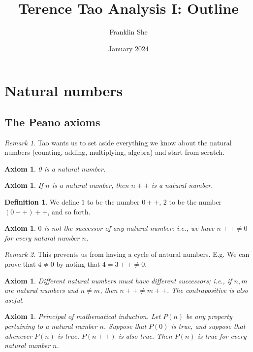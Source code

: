\documentclass[12pt]{article}
\title{Terence Tao Analysis I: Outline}
\author{Franklin She}
\date{January 2024}
\newtheorem{axiom}[theorem]{Axiom}
\theoremstyle{definition}
\newtheorem{definition}[theorem]{Definition}
\theoremstyle{remark}
\newtheorem*{remark}{Remark}
\begin{document}
\maketitle
\tableofcontents

\section{Natural numbers}

\subsection{The Peano axioms}

\begin{remark}
    Tao wants us to set aside everything we know about the natural numbers (counting, adding, multiplying, algebra) and start from scratch.
\end{remark}

\begin{axiom}
    0 is a natural number.
\end{axiom}

\begin{axiom}
    If $n$ is a natural number, then $n++$ is a natural number.
\end{axiom}

\begin{definition}
    We define $1$ to be the number $0++$, $2$ to be the number $(0++)++$, and so forth.
\end{definition}

\begin{axiom}
    $0$ is not the successor of any natural number; i.e., we have $n++ \neq 0$ for every natural number $n$.
\end{axiom}

\begin{remark}
    This prevents us from having a cycle of natural numbers. E.g. We can prove that $4 \neq 0$ by noting that $4 = 3++ \neq 0$.
\end{remark}

\begin{axiom}
    Different natural numbers must have different successors; i.e., if $n,m$ are natural numbers and $n \neq m$, then $n++ \neq m++$. The contrapositive is also useful.
\end{axiom}

\begin{axiom}{Principal of mathematical induction.}
    Let $P(n)$ be any property pertaining to a natural number $n$. Suppose that $P(0)$ is true, and suppose that whenever $P(n)$ is true, $P(n++)$ is also true. Then $P(n)$ is true for every natural number $n$.
\end{axiom}
\end{document}
